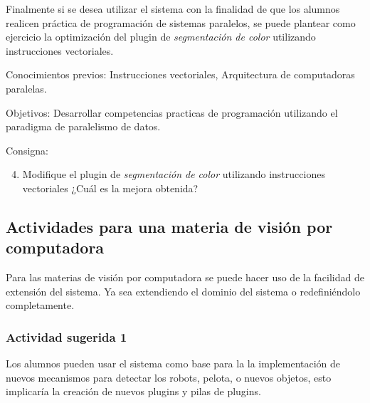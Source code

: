 Finalmente si se desea utilizar el sistema con la finalidad de que los alumnos
realicen práctica de programación de sistemas paralelos, se puede plantear como
ejercicio la optimización del plugin de \emph{segmentación de color} utilizando
instrucciones vectoriales.

\begin{description}

	\item{Conocimientos previos}: Instrucciones vectoriales, Arquitectura de
		computadoras paralelas.

	\item{Objetivos}: Desarrollar competencias practicas de programación
		utilizando el paradigma de paralelismo de datos.

	\item{Consigna}: \begin{enumerate}

	\setcounter{enumi}{3}

	\item{Modifique el plugin de \emph{segmentación de color} utilizando
	instrucciones vectoriales ¿Cuál es la mejora obtenida?}

\end{enumerate}

\end{description}

\subsection{Actividades para una materia de visión por computadora}

Para las materias de visión por computadora se puede hacer uso de la facilidad
de extensión del sistema. Ya sea extendiendo el dominio del sistema o
redefiniéndolo completamente.

\subsubsection{Actividad sugerida 1}

Los alumnos pueden usar el sistema como base para la la implementación de nuevos
mecanismos para detectar los robots, pelota, o nuevos objetos, esto implicaría
la creación de nuevos plugins y pilas de plugins.

